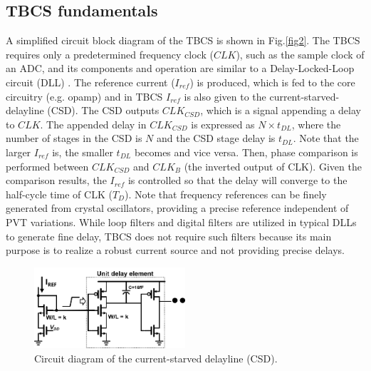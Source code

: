 \documentclass[letterpaper, 10 pt, conference]{ieeeconf}  %
\begin{document}
\subsection{TBCS fundamentals}
A simplified circuit block diagram of the TBCS is shown in Fig.\ref{fig2}. The TBCS requires only a  predetermined frequency clock ($CLK$), such as the sample clock of an ADC, and its components and operation are similar to a Delay-Locked-Loop circuit (DLL) \cite{ sidiropoulos1997semidigital, lee19942, razavi2018delay}. The reference current ($I_{ref}$) is produced, which is fed to the core circuitry (e.g. opamp) and in TBCS $I_{ref}$ is also given to the current-starved-delayline (CSD). The CSD outputs $CLK_{CSD}$, which is a signal appending a delay to $CLK$. The appended delay in $CLK_{CSD}$ is expressed as $N \times t_{DL}$, where the number of stages in the CSD is $N$ and the CSD stage delay is $t_{DL}$. Note that the larger $I_{ref}$ is, the smaller $t_{DL}$ becomes and vice versa. 
Then, phase comparison is performed between $CLK_{CSD}$ and $CLK_B$ (the inverted output of CLK). Given the comparison results, the $I_{ref}$ is controlled so that the delay will converge to the half-cycle time of CLK ($T_D$). Note that frequency references can be finely generated from crystal oscillators, providing a precise reference independent of PVT variations. While loop filters \cite{sidiropoulos1997semidigital} and digital filters \cite{kim20172} are utilized in typical DLLs to generate fine delay, TBCS does not require such filters because its main purpose is to realize a robust current source and not providing precise delays.


\begin{figure}[!]
\centering
 \includegraphics[width=0.5\textwidth]{figs/inv.png}
  \caption{Circuit diagram of the current-starved delayline (CSD).}
\label{inv}
\end{figure}
\end{document}

